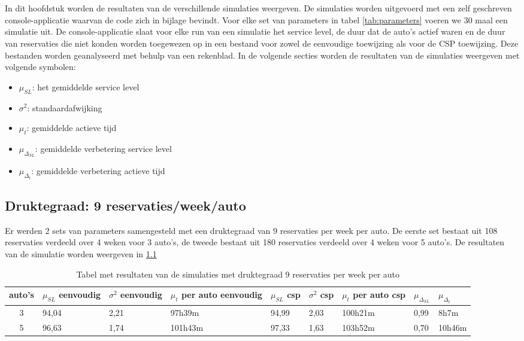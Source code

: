 \chapter{}
\label{ch:resultaten-simulaties}
In dit hoofdstuk worden de resultaten van de verschillende simulaties weergeven. De simulaties worden uitgevoerd met een zelf geschreven console-applicatie waarvan de code zich in bijlage bevindt. Voor elke set van parameters in tabel \ref{tab:parameters} voeren we 30 maal een simulatie uit. De console-applicatie slaat voor elke run van een simulatie het service level, de duur dat de auto's actief waren en de duur van reservaties die niet konden worden toegewezen op in een bestand voor zowel de eenvoudige toewijzing als voor de CSP toewijzing. Deze bestanden worden geanalyseerd met behulp van een rekenblad.
In de volgende secties worden de resultaten van de simulaties weergeven met volgende symbolen:
\begin{itemize}
	\item $\mu_{ SL}$: het gemiddelde service level
	\item $\sigma^2$: standaardafwijking
	\item $\mu_{ t}$: gemiddelde actieve tijd
	\item $\mu_{\Delta_{ SL}}$: gemiddelde verbetering service level
	\item $\mu_{\Delta_{ t}}$: gemiddelde verbetering actieve tijd
\end{itemize}

\section{Druktegraad: 9 reservaties/week/auto}
Er werden 2 sets van parameters samengesteld met een druktegraad van 9 reservaties per week per auto. 
De eerste set bestaat uit 108 reservaties verdeeld over 4 weken voor 3 auto's, de tweede bestaat uit 180 reservaties verdeeld over 4 weken voor 5 auto's. 
De resultaten van de simulatie worden weergeven in \ref{tab:resultaten9}
\begin{table}[h]
	\centering
	\begin{tabular}{ | c | p{1.5cm} | p{1.5cm} | p{1.5cm} | p{1.5cm} | p{1.5cm} | p{1.5cm} | p{1.5cm} | p{1.5cm} |}
		\hline
		auto's & $\mu_{ SL}$ eenvoudig & $\sigma^2$ eenvoudig & $\mu_{ t}$ per auto eenvoudig & $\mu_{ SL}$ csp & $\sigma^2$ csp & $\mu_{ t}$ per auto csp & $\mu_{\Delta_{ SL}}$ & $\mu_{\Delta_{ t}}$ \\ \hline
		3 & 94,04 & 2,21 & 97h39m & 94,99 & 2,03 & 100h21m & 0,99 & 8h7m  \\ \hline
		5 & 96,63 & 1,74 & 101h43m & 97,33 & 1,63 & 103h52m & 0,70 & 10h46m \\ \hline
	\end{tabular}
	\caption{Tabel met resultaten van de simulaties met druktegraad 9 reservaties per week per auto}
	\label{tab:resultaten9}
\end{table}

